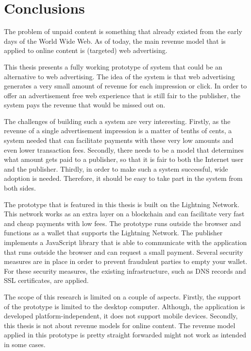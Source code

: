 \chapter{Conclusions}
\label{cha:conclusion}

The problem of unpaid content is something that already existed from the early days of the World Wide Web. As of today, the main revenue model that is applied to online content is (targeted) web advertising.


This thesis presents a fully working prototype of system that could be an alternative to web advertising. The idea of the system is that web advertising generates a very small amount of revenue for each impression or click. In order to offer an advertisement free web experience that is still fair to the publisher, the system pays the revenue that would be missed out on. 

The challenges of building such a system are very interesting. Firstly, as the revenue of a single advertisement impression is a matter of tenths of cents, a system needed that can facilitate payments with these very low amounts and even lower transaction fees. Secondly, there needs to be a model that determines what amount gets paid to a publisher, so that it is fair to both the Internet user and the publisher. Thirdly, in order to make such a system successful, wide adoption is needed. Therefore, it should be easy to take part in the system from both sides.

The prototype that is featured in this thesis is built on the Lightning Network. This network works as an extra layer on a blockchain and can facilitate very fast and cheap payments with low fees. The prototype runs outside the browser and functions as a wallet that supports the Lightning Network. The publisher implements a JavaScript library that is able to communicate with the application that runs outside the browser and can request a small payment. Several security measures are in place in order to prevent fraudulent parties to empty your wallet. For these security measures, the existing infrastructure, such as DNS records and SSL certificates, are applied. 

The scope of this research is limited on a couple of aspects. Firstly, the support of the prototype is limited to the desktop computer. Although, the application is developed platform-independent, it does not support mobile devices. Secondly, this thesis is not about revenue models for online content. The revenue model applied in this prototype is pretty straight forwarded might not work as intended in some cases. 

